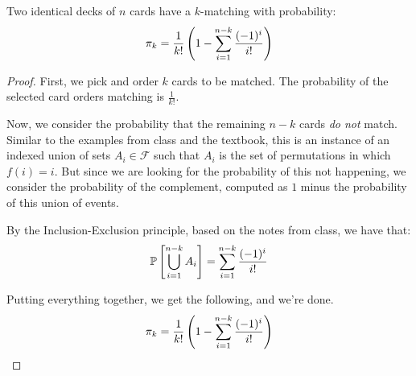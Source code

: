 \documentclass[name=Ojas\ Chaturvedi, emailid=oj.chaturvedi.2024, course=Course\ Name, num=1, deadline=Enter\ Deadline\ Here]{homework}
\begin{document}
\begin{claim}
    Two identical decks of $n$ cards have a $k$-matching with probability:
    $$ \pi_k = \frac1{k!} \left(  1 - \sum_{i = 1}^{n - k} \frac{(-1)^i}{i!}  \right) $$
\end{claim}
\begin{proof}
    First, we pick and order $k$ cards to be matched. The probability of the selected card orders matching is $\frac{1}{k!}$.
    
    Now, we consider the probability that the remaining $n - k$ cards \textit{do not} match. Similar to the examples from class and the textbook, this is an instance of an indexed union of sets $A_i \in \mathcal{F}$ such that $A_i$ is the set of permutations in which $f(i) = i$. But since we are looking for the probability of this not happening, we consider the probability of the complement, computed as $1$ minus the probability of this union of events.
    
    By the Inclusion-Exclusion principle, based on the notes from class, we have that:
    $$ \mathbb{P}\left[  \bigcup_{i = 1}^{n - k} A_i  \right] = \sum_{i = 1}^{n - k} \frac{(-1)^i}{i!} $$
    
    Putting everything together, we get the following, and we're done.
    $$ \pi_k = \frac1{k!} \left(  1 - \sum_{i = 1}^{n - k} \frac{(-1)^i}{i!}  \right)$$
\end{proof}
\end{document}
